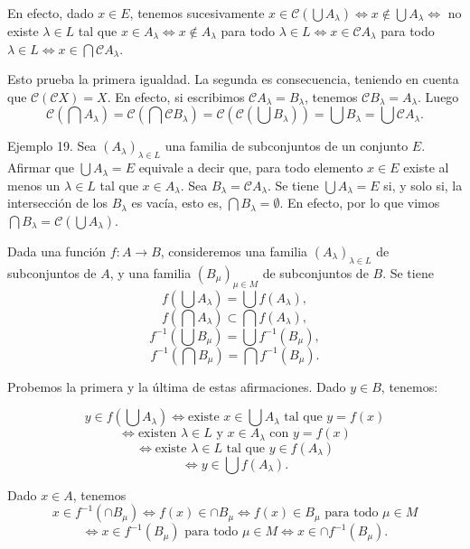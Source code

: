 \documentclass[12pt,oneside]{book}
\begin{document}
En efecto, dado \(x \in E\), tenemos sucesivamente \(x \in \mathcal{C}(\bigcup A_\lambda) \iff x \notin \bigcup A_\lambda \iff\) no existe \(\lambda \in L\) tal que \(x \in A_\lambda \iff x \notin A_\lambda\) para todo \(\lambda \in L \iff x \in \mathcal{C} A_\lambda\) para todo \(\lambda \in L \iff x \in \bigcap \mathcal{C} A_\lambda\).

Esto prueba la primera igualdad. La segunda es consecuencia, teniendo en cuenta que \(\mathcal{C}(\mathcal{C}X) = X\). En efecto, si escribimos \(\mathcal{C} A_\lambda = B_\lambda\), tenemos \(\mathcal{C} B_\lambda = A_\lambda\). Luego
\[
\mathcal{C}\left(\bigcap A_\lambda\right) = \mathcal{C}\left(\bigcap \mathcal{C} B_\lambda\right) = \mathcal{C}\left(\mathcal{C}\left(\bigcup B_\lambda\right)\right) = \bigcup B_\lambda = \bigcup \mathcal{C} A_\lambda.
\]

Ejemplo 19. Sea \((A_\lambda)_{\lambda \in L}\) una familia de subconjuntos de un conjunto \(E\). Afirmar que \(\bigcup A_\lambda = E\) equivale a decir que, para todo elemento \(x \in E\) existe al menos un \(\lambda \in L\) tal que \(x \in A_\lambda\). Sea \(B_\lambda = \mathcal{C} A_\lambda\). Se tiene \(\bigcup A_\lambda = E\) si, y solo si, la intersección de los \(B_\lambda\) es vacía, esto es, \(\bigcap B_\lambda = \emptyset\). En efecto, por lo que vimos \(\bigcap B_\lambda = \mathcal{C}(\bigcup A_\lambda)\).

Dada una función \(f: A \to B\), consideremos una familia \((A_\lambda)_{\lambda \in L}\) de subconjuntos de \(A\), y una familia \((B_\mu)_{\mu \in M}\) de subconjuntos de \(B\). Se tiene
\[
f\left(\bigcup A_\lambda\right) = \bigcup f(A_\lambda),
\]
\[
f\left(\bigcap A_\lambda\right) \subset \bigcap f(A_\lambda),
\]
\[
f^{-1}\left(\bigcup B_\mu\right) = \bigcup f^{-1}(B_\mu),
\]
\[
f^{-1}\left(\bigcap B_\mu\right) = \bigcap f^{-1}(B_\mu).
\]

Probemos la primera y la última de estas afirmaciones. Dado \(y \in B\), tenemos:

\[
y \in f\left(\bigcup A_\lambda\right) \iff \text{existe } x \in \bigcup A_\lambda \text{ tal que } y = f(x)
\]
\[
\iff \text{existen } \lambda \in L \text{ y } x \in A_\lambda \text{ con } y = f(x)
\]
\[
\iff \text{existe } \lambda \in L \text{ tal que } y \in f(A_\lambda)
\]
\[
\iff y \in \bigcup f(A_\lambda).
\]

Dado \( x \in A \), tenemos
\[
x \in f^{-1}(\cap B_\mu) \iff f(x) \in \cap B_\mu \iff f(x) \in B_\mu \text{ para todo } \mu \in M
\]
\[
\iff x \in f^{-1}(B_\mu) \text{ para todo } \mu \in M \iff x \in \cap f^{-1}(B_\mu).
\]
\end{document}
